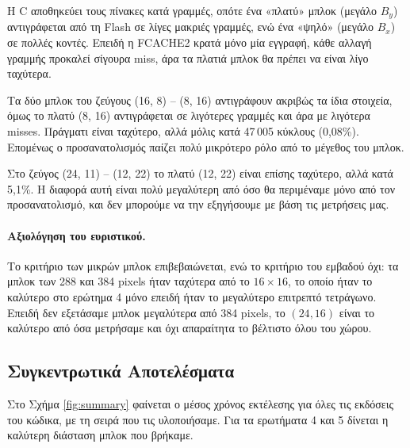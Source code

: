 \documentclass[12pt]{article}
\begin{document}
Η C αποθηκεύει τους πίνακες κατά γραμμές, οπότε ένα «πλατύ» μπλοκ (μεγάλο $B_y$) αντιγράφεται από τη Flash σε λίγες μακριές γραμμές, ενώ ένα «ψηλό» (μεγάλο $B_x$) σε πολλές κοντές. Επειδή η FCACHE2 κρατά μόνο μία εγγραφή, κάθε αλλαγή γραμμής προκαλεί σίγουρα miss, άρα τα πλατιά μπλοκ θα πρέπει να είναι λίγο ταχύτερα.

Τα δύο μπλοκ του ζεύγους (16, 8) -- (8, 16) αντιγράφουν ακριβώς τα ίδια στοιχεία, όμως το πλατύ (8, 16) αντιγράφεται σε λιγότερες γραμμές και άρα με λιγότερα misses. Πράγματι είναι ταχύτερο, αλλά μόλις κατά 47\,005 κύκλους (0,08\%). Επομένως ο προσανατολισμός παίζει πολύ μικρότερο ρόλο από το μέγεθος του μπλοκ.

Στο ζεύγος (24, 11) -- (12, 22) το πλατύ (12, 22) είναι επίσης ταχύτερο, αλλά κατά 5,1\%. Η διαφορά αυτή είναι πολύ μεγαλύτερη από όσο θα περιμέναμε μόνο από τον προσανατολισμό, και δεν μπορούμε να την εξηγήσουμε με βάση τις μετρήσεις μας.

\paragraph{Αξιολόγηση του ευριστικού.}
Το κριτήριο των μικρών μπλοκ επιβεβαιώνεται, ενώ το κριτήριο του εμβαδού όχι: τα μπλοκ των 288 και 384 pixels ήταν ταχύτερα από το $16 \times 16$, το οποίο ήταν το καλύτερο στο ερώτημα 4 μόνο επειδή ήταν το μεγαλύτερο επιτρεπτό τετράγωνο. Επειδή δεν εξετάσαμε μπλοκ μεγαλύτερα από 384 pixels, το $(24, 16)$ είναι το καλύτερο από όσα μετρήσαμε και όχι απαραίτητα το βέλτιστο όλου του χώρου.

\subsection{Συγκεντρωτικά Αποτελέσματα}
Στο Σχήμα \ref{fig:summary} φαίνεται ο μέσος χρόνος εκτέλεσης για όλες τις εκδόσεις του κώδικα, με τη σειρά που τις υλοποιήσαμε. Για τα ερωτήματα 4 και 5 δίνεται η καλύτερη διάσταση μπλοκ που βρήκαμε.
\end{document}
